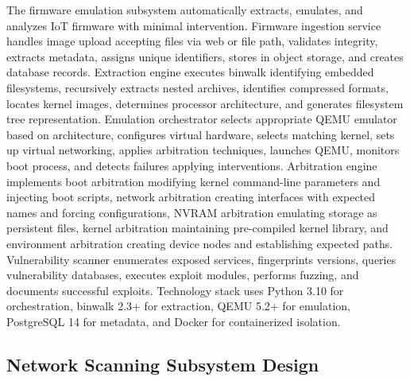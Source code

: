 The firmware emulation subsystem automatically extracts, emulates, and analyzes IoT firmware with minimal intervention. Firmware ingestion service handles image upload accepting files via web or file path, validates integrity, extracts metadata, assigns unique identifiers, stores in object storage, and creates database records. Extraction engine executes binwalk identifying embedded filesystems, recursively extracts nested archives, identifies compressed formats, locates kernel images, determines processor architecture, and generates filesystem tree representation. Emulation orchestrator selects appropriate QEMU emulator based on architecture, configures virtual hardware, selects matching kernel, sets up virtual networking, applies arbitration techniques, launches QEMU, monitors boot process, and detects failures applying interventions. Arbitration engine implements boot arbitration modifying kernel command-line parameters and injecting boot scripts, network arbitration creating interfaces with expected names and forcing configurations, NVRAM arbitration emulating storage as persistent files, kernel arbitration maintaining pre-compiled kernel library, and environment arbitration creating device nodes and establishing expected paths. Vulnerability scanner enumerates exposed services, fingerprints versions, queries vulnerability databases, executes exploit modules, performs fuzzing, and documents successful exploits. Technology stack uses Python 3.10 for orchestration, binwalk 2.3+ for extraction, QEMU 5.2+ for emulation, PostgreSQL 14 for metadata, and Docker for containerized isolation.

\subsection{Network Scanning Subsystem Design}

